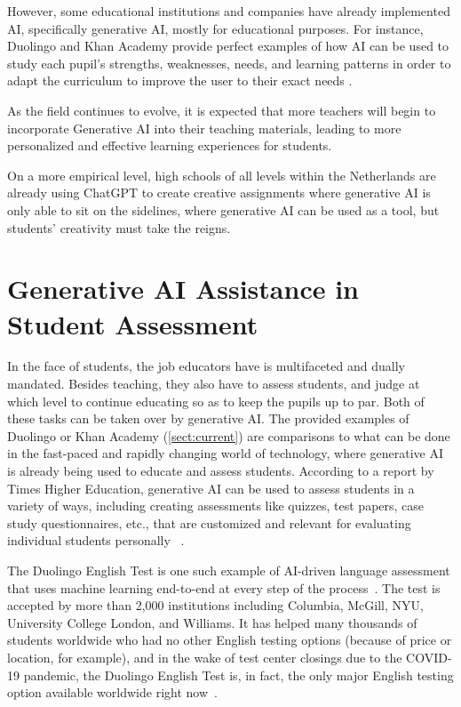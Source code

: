 \documentclass[a4paper,12pt]{report}
\begin{document}
However, some educational institutions and companies have already implemented AI, specifically generative AI, mostly for educational purposes. For instance, Duolingo and Khan Academy provide perfect examples of how AI can be used to study each pupil's strengths, weaknesses, needs, and learning patterns in order to adapt the curriculum to improve the user to their exact needs \cite{genai-examples}.

As the field continues to evolve, it is expected that more teachers will begin to incorporate Generative AI into their teaching materials, leading to more personalized and effective learning experiences for students.

On a more empirical level, high schools of all levels within the Netherlands are already using ChatGPT to create creative assignments where generative AI is only able to sit on the sidelines, where generative AI can be used as a tool, but students' creativity must take the reigns.
\newpage

\section{Generative AI Assistance in Student Assessment} \label{sect:assessment}
\hspace{10mm} In the face of students, the job educators have is multifaceted and dually mandated. Besides teaching, they also have to assess students, and judge at which level to continue educating so as to keep the pupils up to par. Both of these tasks can be taken over by generative AI. The provided examples of Duolingo or Khan Academy (\ref{sect:current}) are comparisons to what can be done in the fast-paced and rapidly changing world of technology, where generative AI is already being used to educate and assess students. According to a report by Times Higher Education, generative AI can be used to assess students in a variety of ways, including creating assessments like quizzes, test papers, case study questionnaires, etc., that are customized and relevant for evaluating individual students personally ~\cite{assessment-possibilities}.

The Duolingo English Test is one such example of AI-driven language assessment that uses machine learning end-to-end at every step of the process~\cite{English-test}. The test is accepted by more than 2,000 institutions including Columbia, McGill, NYU, University College London, and Williams. It has helped many thousands of students worldwide who had no other English testing options (because of price or location, for example), and in the wake of test center closings due to the COVID-19 pandemic, the Duolingo English Test is, in fact, the only major English testing option available worldwide right now~\cite{english-test2}.
\end{document}
